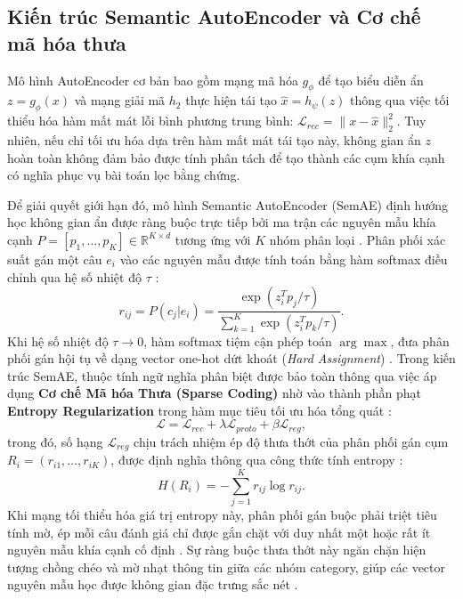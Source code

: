 \subsection{Kiến trúc Semantic AutoEncoder và Cơ chế mã hóa thưa}
\label{subsec:dev-chap2-semae-framework}

Mô hình AutoEncoder cơ bản bao gồm mạng mã hóa $g_\phi$ để tạo biểu diễn ẩn $z=g_\phi(x)$ và mạng giải mã $h_2$ thực hiện tái tạo $\hat{x}=h_\psi(z)$ thông qua việc tối thiểu hóa hàm mất mát lỗi bình phương trung bình: $\mathcal{L}_{rec}=\|x-\hat{x}\|_2^2$. Tuy nhiên, nếu chỉ tối ưu hóa dựa trên hàm mất mát tái tạo này, không gian ẩn $z$ hoàn toàn không đảm bảo được tính phân tách để tạo thành các cụm khía cạnh có nghĩa phục vụ bài toán lọc bằng chứng.

Để giải quyết giới hạn đó, mô hình Semantic AutoEncoder (SemAE) định hướng học không gian ẩn được ràng buộc trực tiếp bởi ma trận các nguyên mẫu khía cạnh $P=[p_1,\ldots,p_K]\in\mathbb{R}^{K\times d}$ tương ứng với $K$ nhóm phân loại \cite{angelidis2021extractive}. Phân phối xác suất gán một câu $e_i$ vào các nguyên mẫu được tính toán bằng hàm softmax điều chỉnh qua hệ số nhiệt độ $\tau$ \cite{angelidis2021extractive}:
\begin{equation}
r_{ij}=P(c_j|e_i)=\frac{\exp(z_i^T p_j/\tau)}{\sum_{k=1}^{K}\exp(z_i^T p_k/\tau)}.
\label{eq:dev-chap2-prototype-assignment}
\end{equation}
Khi hệ số nhiệt độ $\tau \to 0$, hàm softmax tiệm cận phép toán $\arg\max$, đưa phân phối gán hội tụ về dạng vector one-hot dứt khoát (\textit{Hard Assignment}) \cite{angelidis2021extractive}. Trong kiến trúc SemAE, thuộc tính ngữ nghĩa phân biệt được bảo toàn thông qua việc áp dụng \textbf{Cơ chế Mã hóa Thưa (Sparse Coding)} nhờ vào thành phần phạt \textbf{Entropy Regularization} trong hàm mục tiêu tối ưu hóa tổng quát \cite{angelidis2021extractive}:
\begin{equation}
\mathcal{L}=\mathcal{L}_{rec}+\lambda\mathcal{L}_{proto}+\beta\mathcal{L}_{reg},
\label{eq:dev-chap2-semae-loss}
\end{equation}
trong đó, số hạng $\mathcal{L}_{reg}$ chịu trách nhiệm ép độ thưa thớt của phân phối gán cụm $R_i = (r_{i1}, \ldots, r_{iK})$, được định nghĩa thông qua công thức tính entropy \cite{angelidis2021extractive}:
\begin{equation}
H(R_i) = - \sum_{j=1}^{K} r_{ij} \log r_{ij}.
\label{eq:dev-chap2-entropy-reg}
\end{equation}
Khi mạng tối thiểu hóa giá trị entropy này, phân phối gán buộc phải triệt tiêu tính mờ, ép mỗi câu đánh giá chỉ được gắn chặt với duy nhất một hoặc rất ít nguyên mẫu khía cạnh cố định \cite{angelidis2021extractive}. Sự ràng buộc thưa thớt này ngăn chặn hiện tượng chồng chéo và mờ nhạt thông tin giữa các nhóm category, giúp các vector nguyên mẫu học được không gian đặc trưng sắc nét \cite{angelidis2021extractive}.

